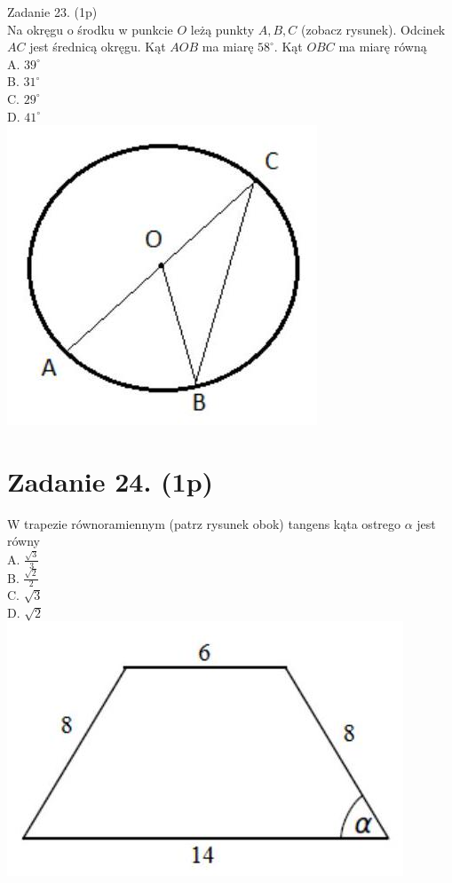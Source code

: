 \documentclass[10pt]{article}
\begin{document}
Zadanie 23. (1p)\\
Na okręgu o środku w punkcie \(O\) leżą punkty \(A, B, C\) (zobacz rysunek). Odcinek \(A C\) jest średnicą okręgu. Kąt \(A O B\) ma miarę \(58^{\circ}\). Kąt \(O B C\) ma miarę równą\\
A. \(39^{\circ}\)\\
B. \(31^{\circ}\)\\
C. \(29^{\circ}\)\\
D. \(41^{\circ}\)\\
\includegraphics[max width=\textwidth, center]{2024_11_21_cce9c7ad32a1dbcd58dag-07(1)}

\section*{Zadanie 24. (1p)}
W trapezie równoramiennym (patrz rysunek obok) tangens kąta ostrego \(\alpha\) jest równy\\
A. \(\frac{\sqrt{3}}{3}\)\\
B. \(\frac{\sqrt{2}}{2}\)\\
C. \(\sqrt{3}\)\\
D. \(\sqrt{2}\)\\
\includegraphics[max width=\textwidth, center]{2024_11_21_cce9c7ad32a1dbcd58dag-07}
\end{document}
